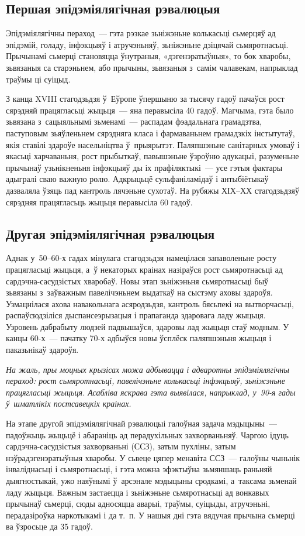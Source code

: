 \subsection*{Першая эпідэміялягічная рэвалюцыя}

Эпідэміялягічны пераход~--- гэта рэзкае зьніжэньне колькасьці сьмерцяў ад эпідэмій, голаду, інфэкцыяў і атручэньняў, зьніжэньне дзіцячай сьмяротнасьці. Прычынамі сьмерці становяцца ўнутраныя, «дэгенэратыўныя», то бок хваробы, зьвязаныя са старэньнем, або прычыны, зьвязаныя з~самім чалавекам, напрыклад траўмы ці суіцыд.

З канца XVIII стагодзьдзя ў~Еўропе ўпершыню за тысячу гадоў пачаўся рост сярэдняй працягласьці жыцьця~--- яна перавысіла 40 гадоў. Магчыма, гэта было зьвязана з~сацыяльнымі зьменамі~--- распадам фэадальнага грамадзтва, паступовым зьяўленьнем сярэдняга класа і фармаваньнем грамадзкіх інстытутаў, якія ставілі здароўе насельніцтва ў~прыярытэт. Паляпшэньне санітарных умоваў і якасьці харчаваньня, рост прыбыткаў, павышэньне ўзроўню адукацыі, разуменьне прычынаў узьнікненьня інфэкцыяў ды іх прафіляктыкі~--- усе гэтыя фактары адыгралі сваю важную ролю. Адкрыцьцё сульфаніламідаў і антыбіётыкаў дазваляла ўзяць пад кантроль лячэньне сухотаў. На рубяжы ХІХ--ХХ стагодзьдзяў сярэдняя працягласьць жыцьця перавысіла 60 гадоў.

\subsection*{Другая эпідэміялягічная рэвалюцыя}

Аднак у~50--60-х гадах мінулага стагодзьдзя намецілася запаволеньне росту працягласьці жыцьця, а~ў некаторых краінах назіраўся рост сьмяротнасьці ад сардэчна-сасудзістых хваробаў. Новы этап зьніжэньня сьмяротнасьці быў зьвязаны з~заўважным павелічэньнем выдаткаў на сыстэму аховы здароўя. Узмацнілася ахова навакольнага асяродзьдзя, кантроль бясьпекі на вытворчасьці, распаўсюдзіліся дыспансеэрызацыя і прапаганда здаровага ладу жыцьця. Узровень дабрабыту людзей падвышаўся, здаровы лад жыцьця стаў модным. У канцы 60-х~--- пачатку 70-х адбыўся новы ўсплёск паляпшэньня жыцьця і паказьнікаў здароўя.

\emph{На жаль, пры моцных крызісах можа адбывацца і адваротны эпідэміялягічны пераход: рост сьмяротнасьці, павелічэньне колькасьці інфэкцыяў, зьніжэньне працягласьці жыцьця. Асабліва яскрава гэта выявілася, напрыклад, у~90-я гады ў~шматлікіх постсавецкіх краінах.}

На этапе другой эпідэміялягічнай рэвалюцыі галоўная задача мэдыцыны~--- падоўжыць жыцьцё і абараніць ад перадухільных захворваньняў. Чаргою ідуць сардэчна-сасудзістыя захворваньні (ССЗ), затым пухліны, затым нэўрадэгенэратыўныя хваробы. У сьвеце цяпер менавіта ССЗ~--- галоўны чыньнік інваліднасьці і сьмяротнасьці, і гэта можна эфэктыўна зьмяншаць раньняй дыягностыкай, ужо наяўнымі ў~арсэнале мэдыцыны сродкамі, а~таксама зьменай ладу жыцьця. Важным застаецца і зьніжэньне сьмяротнасьці ад вонкавых прычынаў сьмерці, сюды адносяцца аварыі, траўмы, суіцыды, атручэньні, перадазіроўка наркотыкамі і да т.~п. У нашыя дні гэта вядучая прычына сьмерці ва ўзросьце да 35 гадоў.

